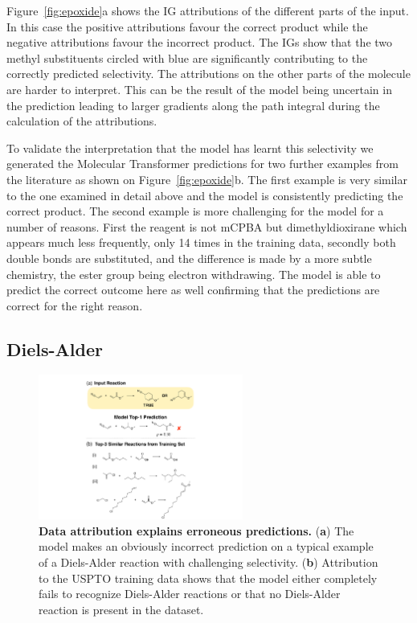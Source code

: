 Figure~\ref{fig:epoxide}a shows the IG attributions of the different parts of the input.  In this case the positive attributions favour the correct product while the negative attributions favour the incorrect product. The IGs show that the two methyl substituents circled with blue are significantly contributing to the correctly predicted selectivity. The attributions on the other parts of the molecule are harder to interpret. This can be the result of the model being uncertain in the prediction leading to larger gradients along the path integral during the calculation of the attributions. 

To validate the interpretation that the model has learnt this selectivity we generated the Molecular Transformer predictions for two further examples from the literature as shown on Figure~\ref{fig:epoxide}b. The first example is very similar to the one examined in detail above and the model is consistently predicting the correct product. The second example is more challenging for the model for a number of reasons. First the reagent is not mCPBA but dimethyldioxirane which appears much less frequently, only 14 times in the training data, secondly both double bonds are substituted, and the difference is made by a more subtle chemistry, the ester group being electron withdrawing. The model is able to predict the correct outcome here as well confirming that the predictions are correct for the right reason. 

\subsection{Diels-Alder}

\begin{figure}[ht!]
    \centering
    \includegraphics[width=0.6\textwidth]{Chapters/Transformer/Figs/diels_alder.pdf}
    \caption{\label{fig:diels_alder} \textbf{Data attribution explains erroneous predictions.} (\textbf{a}) The model makes an obviously incorrect prediction on a typical example of a Diels-Alder reaction with challenging selectivity. (\textbf{b}) Attribution to the USPTO training data shows that the model either completely fails to recognize Diels-Alder reactions or that no Diels-Alder reaction is present in the dataset.}
\end{figure}

